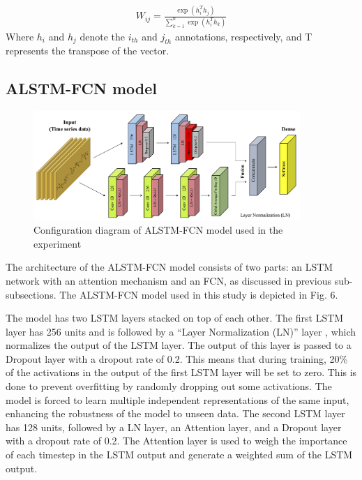 \documentclass{ieeeaccess}
\begin{document}
\begin{align}
    W_{ij} = \frac{\exp(h_i^T h_j)}{\sum_{k=1}^{n} \exp(h_i^T h_k)}
\end{align}
Where $h_i$ and $h_j$ denote the $i_{th}$ and $j_{th}$ annotations, respectively, and T represents the transpose of the vector. 


\subsection{ALSTM-FCN model}

\begin{figure}[t!]
  \centering
  \includegraphics[width=0.9\textwidth]{ALSTM-FCN.jpg}
  \caption{Configuration diagram of ALSTM-FCN model used in the experiment}
  \label{ALSTM-FCN}
\end{figure}

The architecture of the ALSTM-FCN model consists of two parts: an LSTM network with an attention mechanism and an FCN, as discussed in previous sub-subsections. The ALSTM-FCN model used in this study is depicted in Fig. 6.

The model has two LSTM layers stacked on top of each other. The first LSTM layer has 256 units and is followed by a “Layer Normalization (LN)” layer \cite{Ba_2016}, which normalizes the output of the LSTM layer. The output of this layer is passed to a Dropout layer with a dropout rate of 0.2. This means that during training, 20\% of the activations in the output of the first LSTM layer will be set to zero. This is done to prevent overfitting by randomly dropping out some activations. The model is forced to learn multiple independent representations of the same input, enhancing the robustness of the model to unseen data. The second LSTM layer has 128 units, followed by a LN layer, an Attention layer, and a Dropout layer with a dropout rate of 0.2. The Attention layer is used to weigh the importance of each timestep in the LSTM output and generate a weighted sum of the LSTM output. 
\end{document}

